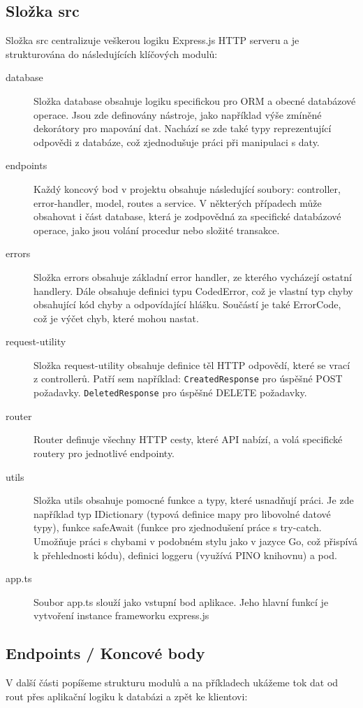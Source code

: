 \subsection{Složka src}
Složka src centralizuje veškerou logiku Express.js HTTP serveru a je strukturována do následujících klíčových modulů:
\begin{description}
    \item[database] 
    Složka database obsahuje logiku specifickou pro ORM a obecné databázové operace. Jsou zde definovány nástroje, jako například výše zmíněné dekorátory pro mapování dat. Nachází se zde také typy reprezentující odpovědi z databáze, což zjednodušuje práci při manipulaci s daty.
    \item[endpoints]
    Každý koncový bod v projektu obsahuje následující soubory: controller, error-handler, model, routes a service. V některých případech může obsahovat i část database, která je zodpovědná za specifické databázové operace, jako jsou volání procedur nebo složité transakce.
    \item[errors] 
    Složka errors obsahuje základní error handler, ze kterého vycházejí ostatní handlery. Dále obsahuje definici typu CodedError, což je vlastní typ chyby obsahující kód chyby a odpovídající hlášku. Součástí je také ErrorCode, což je výčet chyb, které mohou nastat.
    \item[request-utility] 
    Složka request-utility obsahuje definice těl HTTP odpovědí, které se vrací z controllerů. Patří sem například:
    \texttt{CreatedResponse} pro úspěšné POST požadavky.
    \texttt{DeletedResponse} pro úspěšné DELETE požadavky.
    \item[router] 
    Router definuje všechny HTTP cesty, které API nabízí, a volá specifické routery pro jednotlivé endpointy.
    \item[utils] 
    Složka utils obsahuje pomocné funkce a typy, které usnadňují práci. Je zde například typ IDictionary (typová definice mapy pro libovolné datové typy), funkce safeAwait (funkce pro zjednodušení práce s try-catch. Umožňuje práci s chybami v podobném stylu jako v jazyce Go, což přispívá k přehlednosti kódu), definici loggeru (využívá PINO knihovnu) a pod.
    \item[app.ts] 
    Soubor app.ts slouží jako vstupní bod aplikace. Jeho hlavní funkcí je vytvoření instance frameworku express.js
\end{description} 

\subsection{Endpoints / Koncové body}
V další části popíšeme strukturu modulů a na příkladech ukážeme tok dat od rout přes aplikační logiku k databázi a zpět ke klientovi:

